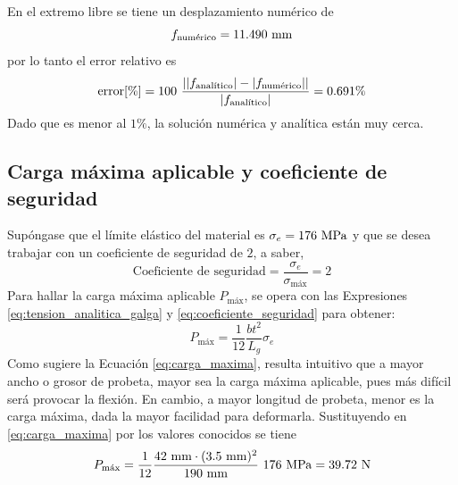 En el extremo libre se tiene un desplazamiento numérico de
\[
    f_\text{numérico} = 11.490 \ \milli\meter
\]
por lo tanto el error relativo es
\[
    \text{error}[\%] = 
    100 \ \frac{\abs{ \abs{f_\text{analítico}} - \abs{f_\text{numérico}}} }{\abs{f_\text{analítico}}} = 0.691 \%
\]
Dado que es menor al $1\%$, la solución numérica y analítica están muy cerca.


\subsection{Carga máxima aplicable y coeficiente de seguridad} \label{sec:carga_maxima_aplicable_y_coeficiente_de_seguridad}

Supóngase que el límite elástico del material es $\sigma_e = 176 \ \mega\pascal$ y que se desea trabajar con un coeficiente de seguridad de $2$, a saber,
\begin{equation} \label{eq:coeficiente_seguridad}
    \text{Coeficiente de seguridad} = 
    \frac{\sigma_e}{\sigma_\text{máx}} = 2
\end{equation}
Para hallar la carga máxima aplicable $P_\text{máx}$, se opera con las Expresiones \eqref{eq:tension_analitica_galga} y \eqref{eq:coeficiente_seguridad} para obtener:
\begin{equation} \label{eq:carga_maxima}
    P_\text{máx} = \frac{1}{12} \frac{b t^2}{L_g} \sigma_e
\end{equation}
Como sugiere la Ecuación \eqref{eq:carga_maxima}, resulta intuitivo que a mayor ancho o grosor de probeta, mayor sea la carga máxima aplicable, pues más difícil será provocar la flexión. En cambio, a mayor longitud de probeta, menor es la carga máxima, dada la mayor facilidad para deformarla. Sustituyendo en \eqref{eq:carga_maxima} por los valores conocidos se tiene
\[
    P_\text{máx} = 
    \frac{1}{12} \frac{42 \ \milli\meter \cdot (3.5 \ \milli\meter)^2}{190 \ \milli\meter} \ 176 \ \mega\pascal = 
    39.72 \ \newton
\]


